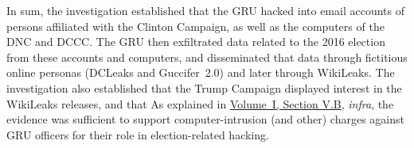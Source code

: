 \hr

In sum, the investigation established that the GRU hacked into email accounts of persons affiliated with the Clinton Campaign, as well as the computers of the DNC and DCCC\null.
The GRU then exfiltrated data related to the 2016 election from these accounts and computers, and disseminated that data through fictitious online personas (DCLeaks and Guccifer~2.0) and later through WikiLeaks.
The investigation also established that the Trump Campaign displayed interest in the WikiLeaks releases, and that 
As explained in \hyperlink{subsection.1.5.2}{Volume~I, Section V.B}, \textit{infra}, the evidence was sufficient to support computer-intrusion (and other) charges against GRU officers for their role in election-related hacking.
